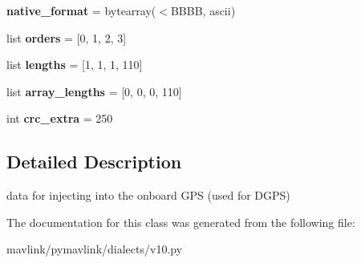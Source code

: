 \begin{DoxyCompactItemize}
{\bfseries native\+\_\+format} = bytearray(\textquotesingle{}$<$B\+B\+BB\textquotesingle{}, \textquotesingle{}ascii\textquotesingle{})
\item 
\mbox{\label{classpymavlink_1_1dialects_1_1v10_1_1MAVLink__gps__inject__data__message_abdeb7f9d13a97620e83905c0f3db3c6a}} 
list {\bfseries orders} = \mbox{[}0, 1, 2, 3\mbox{]}
\item 
\mbox{\label{classpymavlink_1_1dialects_1_1v10_1_1MAVLink__gps__inject__data__message_a92957cef47cfc21618f79e02e9f02a7b}} 
list {\bfseries lengths} = \mbox{[}1, 1, 1, 110\mbox{]}
\item 
\mbox{\label{classpymavlink_1_1dialects_1_1v10_1_1MAVLink__gps__inject__data__message_a3b58906249e7599bc1f98083dda22c71}} 
list {\bfseries array\+\_\+lengths} = \mbox{[}0, 0, 0, 110\mbox{]}
\item 
\mbox{\label{classpymavlink_1_1dialects_1_1v10_1_1MAVLink__gps__inject__data__message_a8e577f3a77154cea2bb95b92028152e5}} 
int {\bfseries crc\+\_\+extra} = 250
\end{DoxyCompactItemize}


\subsection{Detailed Description}
\begin{DoxyVerb}data for injecting into the onboard GPS (used for DGPS)
\end{DoxyVerb}
 

The documentation for this class was generated from the following file\+:\begin{DoxyCompactItemize}
\item 
mavlink/pymavlink/dialects/v10.\+py\end{DoxyCompactItemize}
